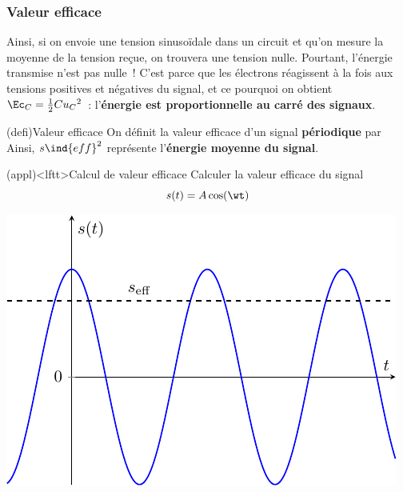 \documentclass[../../main/main.tex]{subfiles}
\begin{document}
\subsubsection{Valeur efficace}
Ainsi, si on envoie une tension sinusoïdale dans un circuit et qu'on mesure la
moyenne de la tension reçue, on trouvera une tension nulle. Pourtant, l'énergie
transmise n'est pas nulle~! C'est parce que les électrons réagissent à la fois
aux tensions positives et négatives du signal, et ce pourquoi on obtient $\Ec_C
	= \frac{1}{2}Cu_C{}^{2}$~: l'\textbf{énergie est proportionnelle au carré des
	signaux}.
\begin{tcb*}(defi){Valeur efficace}
	On définit la valeur efficace d'un signal \textbf{périodique} par
	\psw{%
		\[
			s \ind{eff} = \sqrt{\moy{s^{2}(t)}}
		\]
	}%
	Ainsi, $s \ind{eff}^{2}$ représente l'\textbf{énergie moyenne du signal}.
\end{tcb*}

\begin{tcb*}[sidebyside, lefthand ratio=.4](appl)<lftt>{Calcul de valeur efficace}
	Calculer la valeur efficace du signal
	\[
		s(t) = A \cos(\wt)
	\]
	\begin{center}
		\includegraphics[width=\linewidth]{veff_cos}
	\end{center}
	\tcblower
	\vspace{-15pt}
\end{tcb*}
\end{document}
